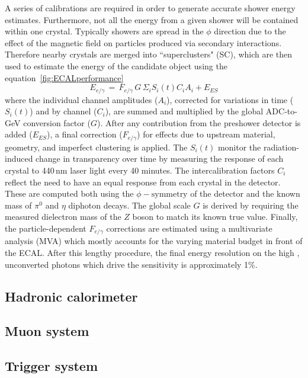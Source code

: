 A series of calibrations are required in order to generate accurate shower energy estimates.
Furthermore, not all the energy from a given shower will be contained within one crystal.
Typically showers are spread in the $\phi$ direction due to the effect of the magnetic field on particles produced via secondary interactions.
Therefore nearby crystals are merged into ``superclusters" (SC), 
which are then used to estimate the energy of the candidate object using the equation~\ref{fig:ECALperformance}
\begin{equation}
E_{e/\gamma}\, =\, F_{e/\gamma}\, G\, \Sigma_i S_i (t) C_i A_i + E_{ES}
\end{equation}
where the individual channel amplitudes ($A_i$), corrected for variations in time ($S_i (t)$) and by channel ($C_i$), 
are summed and multiplied by the global ADC-to-GeV conversion factor ($G$).
After any contribution from the preshower detector is added ($E_{ES}$), 
a final correction ($F_{e/\gamma}$) for effects due to upstream material, geometry, and imperfect clustering is applied. 
The $S_i (t)$ monitor the radiation-induced change in transparency over time by measuring the response of each crystal to 440\,nm laser light every 40 minutes. %
The intercalibration factors $C_i$ reflect the need to have an equal response from each crystal in the detector.
These are computed both using the $\phi-\textrm{symmetry}$ of the detector and the known mass of $\pi^{0}$ and $\eta$ diphoton decays.
The global scale $G$ is derived by requiring the measured dielectron mass of the $Z$ boson to match its known true value.
Finally, the particle-dependent $F_{e/\gamma}$ corrections are estimated using a multivariate analysis (MVA) which mostly accounts for the varying material budget in front of the ECAL.
After this lengthy procedure, the final energy resolution on the high \pt, unconverted photons which drive the \Hgg sensitivity is approximately 1\%.

\subsection{Hadronic calorimeter}



\subsection{Muon system}
\subsection{Trigger system}
